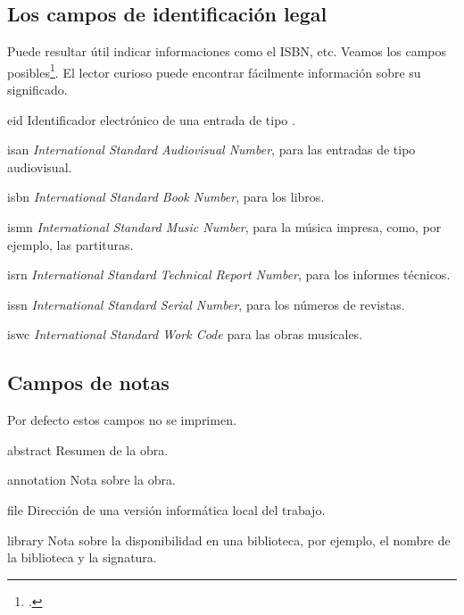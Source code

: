 \subsection{Los campos de identificación legal}

Puede resultar útil indicar informaciones como el ISBN, etc. Veamos
los campos posibles\footcite[Por defecto,  imprime
estos campo si se rellenan. Pero siempre se puede impedir que que se
vean, pasando la opción  cuando se carga el
package, véase:][]{biblatex_isbn}.  El lector curioso puede encontrar
fácilmente información sobre su significado.

\begin{choix}
	\item[eid] Identificador electrónico de una entrada de tipo .
   	\item[isan] \emph{\textenglish{International Standard
              Audiovisual Number}}, para las entradas de tipo audiovisual.
   	\item[isbn] \emph{\textenglish{International Standard Book
              Number}}, para los libros.
   	\item[ismn] \emph{\textenglish{International Standard Music
              Number}}, para la música impresa, como, por ejemplo, las
          partituras.
   	\item[isrn] \emph{\textenglish{International Standard
              Technical Report Number}}, para los informes técnicos.
   	\item[issn] \emph{\textenglish{International Standard Serial
              Number}}, para los números de revistas.
   	\item[iswc] \emph{\textenglish{International Standard Work
              Code}} para las obras musicales.
\end{choix}

\subsection{Campos de notas}

Por defecto estos campos no se imprimen.

\begin{choix}
	\item[abstract] Resumen de la obra.
   	\item[annotation] Nota sobre la obra.
   	\item[file] Dirección de una versión informática local del trabajo.
   	\item[library] Nota sobre la disponibilidad en una biblioteca,
          por ejemplo, el nombre de la biblioteca y la signatura.
\end{choix}

